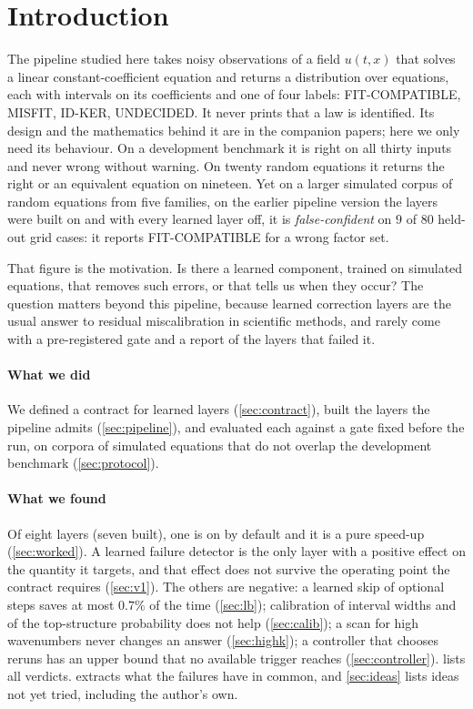 \documentclass[11pt]{article}
\theoremstyle{plain}
\theoremstyle{definition}
\theoremstyle{remark}
\newcommand{\lab}[1]{\textsf{#1}}           %
\newcommand{\FC}{\lab{FIT-COMPATIBLE}}
\newcommand{\IDK}{\lab{ID-KER}}
\newcommand{\MIS}{\lab{MISFIT}}
\newcommand{\UND}{\lab{UNDECIDED}}
\begin{document}
\section{Introduction}\label{sec:intro}
The pipeline studied here takes noisy observations of a field $u(t,x)$ that solves a linear constant-coefficient equation
and returns a distribution over equations, each with intervals on its coefficients and one of four labels: \FC, \MIS,
\IDK, \UND{}. It never prints that a law is identified. Its design and the mathematics behind it are in the companion
papers; here we only need its behaviour. On a development benchmark it is right on all thirty inputs and never wrong
without warning. On twenty random equations it returns the right or an equivalent equation on nineteen. Yet on a larger
simulated corpus of random equations from five families, on the earlier pipeline version the layers were built on and with every learned layer off, it is \emph{false-confident} on
$9$ of $80$ held-out grid cases: it reports \FC{} for a wrong factor set.

That figure is the motivation. Is there a learned component, trained on simulated equations, that removes such errors,
or that tells us when they occur? The question matters beyond this pipeline, because learned correction layers are
the usual answer to residual miscalibration in scientific methods, and rarely come with a pre-registered gate and a
report of the layers that failed it.

\paragraph{What we did} We defined a contract for learned layers (\cref{sec:contract}), built the layers the pipeline
admits (\cref{sec:pipeline}), and evaluated each against a gate fixed before the run, on corpora of simulated equations that
do not overlap the development benchmark (\cref{sec:protocol}).

\paragraph{What we found} Of eight layers (seven built), one is on by default and it is a pure speed-up (\cref{sec:worked}). A learned
failure detector is the only layer with a positive effect on the quantity it targets, and that effect does not survive the
operating point the contract requires (\cref{sec:v1}). The others are negative: a learned skip of optional steps saves
at most $0.7\%$ of the time (\cref{sec:lb}); calibration of interval widths and of the top-structure probability does not
help (\cref{sec:calib}); a scan for high wavenumbers never changes an answer (\cref{sec:highk}); a controller that
chooses reruns has an upper bound that no available trigger reaches (\cref{sec:controller}).  lists all
verdicts.  extracts what the failures have in common, and \cref{sec:ideas} lists ideas not yet tried,
including the author's own.
\end{document}
